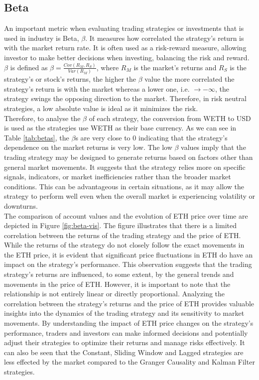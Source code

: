 \subsection{Beta}
An important metric when evaluating trading strategies or investments that is used in industry is Beta, $\beta$. It measures how correlated the strategy's return is with the market return rate. It is often used as a risk-reward measure, allowing investor to make better decisions when investing, balancing the risk and reward. $\beta$ is defined as $\beta = \frac{Cov(R_M, R_S)}{Var(R_M)}$, where $R_M$ is the market's returns and $R_S$ is the strategy's or stock's returns, the higher the $\beta$ value the more correlated the strategy's return is with the market whereas a lower one, i.e. $\rightarrow - \infty$, the strategy swings the opposing direction to the market. Therefore, in risk neutral strategies, a low absolute value is ideal as it minimizes the risk.
\\[3mm]
Therefore, to analyse the $\beta$ of each strategy, the conversion from WETH to USD is used as the strategies use WETH as their base currency. As we can see in Table \ref{tab:betas}, the $\beta$s are very close to 0 indicating that the strategy's dependence on the market returns is very low. The low $\beta$ values imply that the trading strategy may be designed to generate returns based on factors other than general market movements. It suggests that the strategy relies more on specific signals, indicators, or market inefficiencies rather than the broader market conditions. This can be advantageous in certain situations, as it may allow the strategy to perform well even when the overall market is experiencing volatility or downturns.
\\[3mm]
The comparison of account values and the evolution of ETH price over time are depicted in Figure \ref{fig:beta-vis}. The figure illustrates that there is a limited correlation between the returns of the trading strategy and the price of ETH. While the returns of the strategy do not closely follow the exact movements in the ETH price, it is evident that significant price fluctuations in ETH do have an impact on the strategy's performance. This observation suggests that the trading strategy's returns are influenced, to some extent, by the general trends and movements in the price of ETH. However, it is important to note that the relationship is not entirely linear or directly proportional. Analyzing the correlation between the strategy's returns and the price of ETH provides valuable insights into the dynamics of the trading strategy and its sensitivity to market movements. By understanding the impact of ETH price changes on the strategy's performance, traders and investors can make informed decisions and potentially adjust their strategies to optimize their returns and manage risks effectively. It can also be seen that the Constant, Sliding Window and Lagged strategies are less effected by the market compared to the Granger Causality and Kalman Filter strategies.

